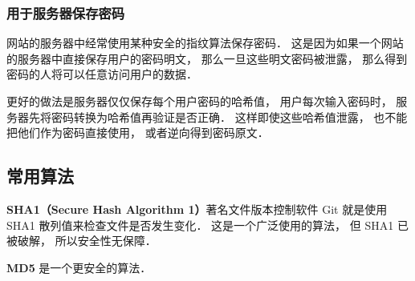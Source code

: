 \subsubsection{用于服务器保存密码}
网站的服务器中经常使用某种安全的指纹算法保存密码． 这是因为如果一个网站的服务器中直接保存用户的密码明文， 那么一旦这些明文密码被泄露， 那么得到密码的人将可以任意访问用户的数据．

更好的做法是服务器仅仅保存每个用户密码的哈希值， 用户每次输入密码时， 服务器先将密码转换为哈希值再验证是否正确． 这样即使这些哈希值泄露， 也不能把他们作为密码直接使用， 或者逆向得到密码原文．

\subsection{常用算法}
\textbf{SHA1（Secure Hash Algorithm 1）}著名文件版本控制软件 Git %
就是使用 SHA1 散列值来检查文件是否发生变化． 这是一个广泛使用的算法， 但 SHA1 已被破解， 所以安全性无保障．

\textbf{MD5} 是一个更安全的算法．
